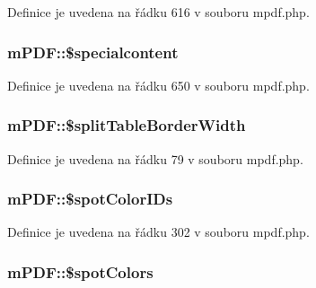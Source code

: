 Definice je uvedena na řádku 616 v souboru mpdf.\-php.

\hypertarget{classm_p_d_f_a5ed50e37ca659adcbd0e0cccf45d7e81}{
\subsubsection[{\$specialcontent}]{\setlength{\rightskip}{0pt plus 5cm}m\-P\-D\-F\-::\$specialcontent}}\label{classm_p_d_f_a5ed50e37ca659adcbd0e0cccf45d7e81}


Definice je uvedena na řádku 650 v souboru mpdf.\-php.

\hypertarget{classm_p_d_f_a8ecd4403daa1ea02e1ea0f2bb44ebf23}{
\subsubsection[{\$split\-Table\-Border\-Width}]{\setlength{\rightskip}{0pt plus 5cm}m\-P\-D\-F\-::\$split\-Table\-Border\-Width}}\label{classm_p_d_f_a8ecd4403daa1ea02e1ea0f2bb44ebf23}


Definice je uvedena na řádku 79 v souboru mpdf.\-php.

\hypertarget{classm_p_d_f_a8c05322cbfc1a806f036330e8c3d94fc}{
\subsubsection[{\$spot\-Color\-I\-Ds}]{\setlength{\rightskip}{0pt plus 5cm}m\-P\-D\-F\-::\$spot\-Color\-I\-Ds}}\label{classm_p_d_f_a8c05322cbfc1a806f036330e8c3d94fc}


Definice je uvedena na řádku 302 v souboru mpdf.\-php.

\hypertarget{classm_p_d_f_a51de96baebc003b95bf9ec71c5722a35}{
\subsubsection[{\$spot\-Colors}]{\setlength{\rightskip}{0pt plus 5cm}m\-P\-D\-F\-::\$spot\-Colors}}\label{classm_p_d_f_a51de96baebc003b95bf9ec71c5722a35}


